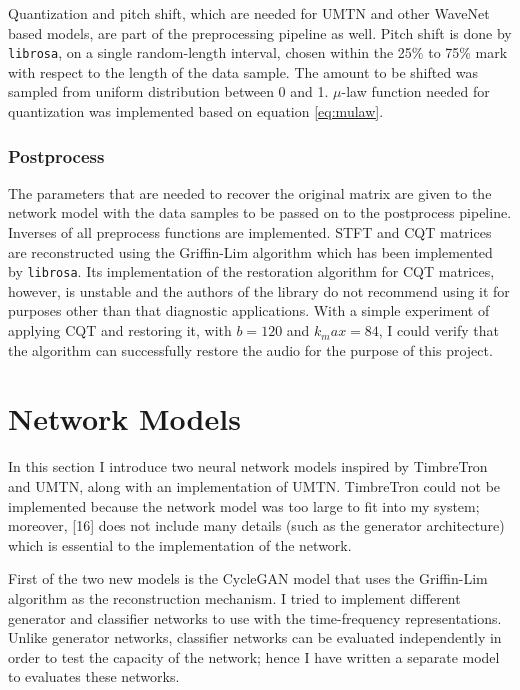 \documentclass[12pt,a4paper,]{report}
\begin{document}
Quantization and pitch shift, which are needed for UMTN and other
WaveNet based models, are part of the preprocessing pipeline as well.
Pitch shift is done by \texttt{librosa}, on a single random-length
interval, chosen within the 25\% to 75\% mark with respect to the length
of the data sample. The amount to be shifted was sampled from uniform
distribution between 0 and 1. \(\mu\)-law function needed for
quantization was implemented based on equation \ref{eq:mulaw}.

\hypertarget{postprocess}{%
\subsubsection{Postprocess}\label{postprocess}}

The parameters that are needed to recover the original matrix are given
to the network model with the data samples to be passed on to the
postprocess pipeline. Inverses of all preprocess functions are
implemented. STFT and CQT matrices are reconstructed using the
Griffin-Lim algorithm which has been implemented by \texttt{librosa}.
Its implementation of the restoration algorithm for CQT matrices,
however, is unstable and the authors of the library do not recommend
using it for purposes other than that diagnostic applications. With a
simple experiment of applying CQT and restoring it, with \(b = 120\) and
\(k_max = 84\), I could verify that the algorithm can successfully
restore the audio for the purpose of this project.

\hypertarget{network-models}{%
\section{Network Models}\label{network-models}}

In this section I introduce two neural network models inspired by
TimbreTron and UMTN, along with an implementation of UMTN. TimbreTron
could not be implemented because the network model was too large to fit
into my system; moreover, {[}16{]} does not include many details (such
as the generator architecture) which is essential to the implementation
of the network.

First of the two new models is the CycleGAN model that uses the
Griffin-Lim algorithm as the reconstruction mechanism. I tried to
implement different generator and classifier networks to use with the
time-frequency representations. Unlike generator networks, classifier
networks can be evaluated independently in order to test the capacity of
the network; hence I have written a separate model to evaluates these
networks.
\end{document}
